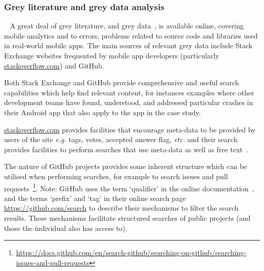 \subsubsection{Grey literature and grey data analysis}~\label{section-grey-literature-and-data-analysis-research-method}   
A great deal of grey literature, and grey data~\citep[pp 219-221]{banks2010_blog_posts_and_tweets_the_next_frontier_for_grey_literature}, is available online, covering mobile analytics and to errors, problems related to source code and libraries used in real-world mobile apps. The main sources of relevant grey data include Stack Exchange websites frequented by mobile app developers (particularly \href{https://stackoverflow.com/}{stackoverflow.com}) and GitHub. 

Both Stack Exchange and GitHub provide comprehensive and useful search capabilities which help find relevant content, for instances examples where other development teams have found, understood, and addressed particular crashes in their Android app that also apply to the app in the case study.

\href{https://stackoverflow.com/}{stackoverflow.com} provides facilities that encourage meta-data to be provided by users of the site \textit{e.g.} tags, votes, accepted answer flag, \textit{etc.} and their search provides facilities to perform searches that use meta-data as well as free text~\citep{stackoverflow2021_search_help}.

The nature of GitHub projects provides some inherent structure which can be utilised when performing searches, for example to search issues and pull requests~\footnote{\url{https://docs.github.com/en/search-github/searching-on-github/searching-issues-and-pull-requests}}. Note: GitHub uses the term `qualifier' in the online documentation~\citep{github2021_searching_code_github_docs}, and the terms `prefix' and `tag' in their online search page \url{https://github.com/search} to describe their mechanisms to filter the search results. These mechanisms facilitate structured searches of public projects (and those the individual also has access to).



